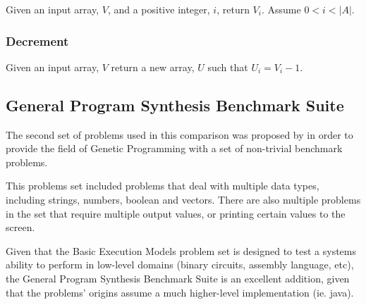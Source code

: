 Given an input array, $V$, and a positive integer, $i$, return $V_i$. Assume $0 < i < |A|$.

\subsubsection{Decrement}

Given an input array, $V$ return a new array, $U$ such that $U_i = V_i - 1$.


\subsection{General Program Synthesis Benchmark Suite}
The second set of problems used in this comparison was proposed by \cite{Helmuth2015b} in order to provide the field of Genetic Programming with a set of non-trivial benchmark problems.

This problems set included problems that deal with multiple data types, including strings, numbers, boolean and vectors. There are also multiple problems in the set that require multiple output values, or printing certain values to the screen.

Given that the Basic Execution Models problem set is designed to test a systems ability to perform in low-level domains (binary circuits, assembly language, etc), the General Program Synthesis Benchmark Suite is an excellent addition, given that the problems' origins assume a much higher-level implementation (ie. java).

